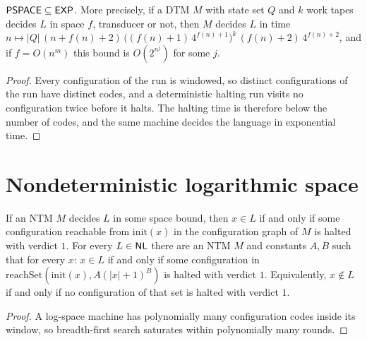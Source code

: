 \begin{theorem}
  \label{thm:space-pspace-subset-exp}
  \leanok
  $\mathsf{PSPACE} \subseteq \mathsf{EXP}$. More precisely, if a DTM $M$ with state set
  $Q$ and $k$ work tapes decides $L$ in space $f$, transducer or not, then $M$
  decides $L$ in time
  $n \mapsto |Q|\,(n + f(n) + 2)\,\bigl((f(n) + 1)\,4^{f(n) + 1}\bigr)^k\,
  (f(n) + 2)\,4^{f(n) + 2}$, and if $f = O(n^m)$ this bound is
  $O(2^{n^j})$ for some $j$.
\end{theorem}
\begin{proof}
  \leanok
  Every configuration of the run is windowed, so distinct configurations of
  the run have distinct codes, and a deterministic halting run visits no
  configuration twice before it halts. The halting time is therefore below the
  number of codes, and the same machine decides the language in exponential
  time.
\end{proof}

\section{Nondeterministic logarithmic space}

\begin{lemma}
  \label{lem:space-nl-reachability}
  \leanok
  If an NTM $M$ decides $L$ in some space bound, then $x \in L$ if and only if
  some configuration reachable from $\mathrm{init}(x)$ in the configuration
  graph of $M$ is halted with verdict $1$. For every $L \in \mathsf{NL}$ there are
  an NTM $M$ and constants $A, B$ such that for every $x$: $x \in L$ if and
  only if some configuration in
  $\mathrm{reachSet}(\mathrm{init}(x), A(|x| + 1)^B)$ is halted with verdict
  $1$. Equivalently, $x \notin L$ if and only if no configuration of that set is
  halted with verdict $1$.
\end{lemma}
\begin{proof}
  \leanok
  A log-space machine has polynomially many configuration codes inside its
  window, so breadth-first search saturates within polynomially many rounds.
\end{proof}

